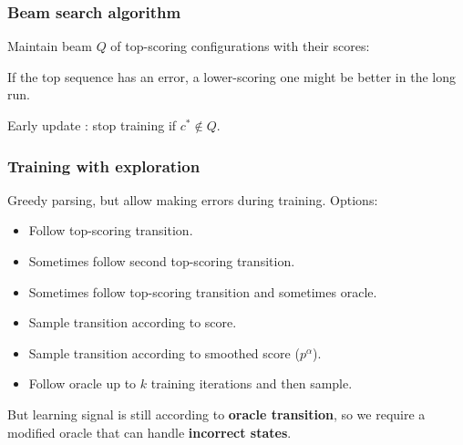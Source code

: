 \documentclass[t]{beamer}
\begin{document}
\begin{frame}
  \frametitle{Beam search algorithm}
    Maintain beam $Q$ of top-scoring configurations with their scores:
    
    \begin{algorithmic}[0]
    \ENDWHILE
    \end{algorithmic}
    
    \pause\vfill
    
    If the top sequence has an error, a lower-scoring one might be better in the long run.
    
    \pause\vfill
    
    Early update \cite{Coll:04}: stop training if $c^* \not\in Q$.
\end{frame}


\begin{frame}
  \frametitle{Training with exploration \cite{goldberg2013training}}
  Greedy parsing, but allow making errors during training. Options:
  
  \begin{itemize}
  \item Follow top-scoring transition.
  \item Sometimes follow second top-scoring transition.
  \item Sometimes follow top-scoring transition and sometimes oracle.
  \item Sample transition according to score.
  \item Sample transition according to smoothed score ($p^\alpha$).
  \item Follow oracle up to $k$ training iterations and then sample.
  \end{itemize}
  
  \pause\vfill
  
  But learning signal is still according to \textbf{oracle transition}, so
  we require a modified oracle that can handle \textbf{incorrect states}.
\end{frame}
\end{document}

